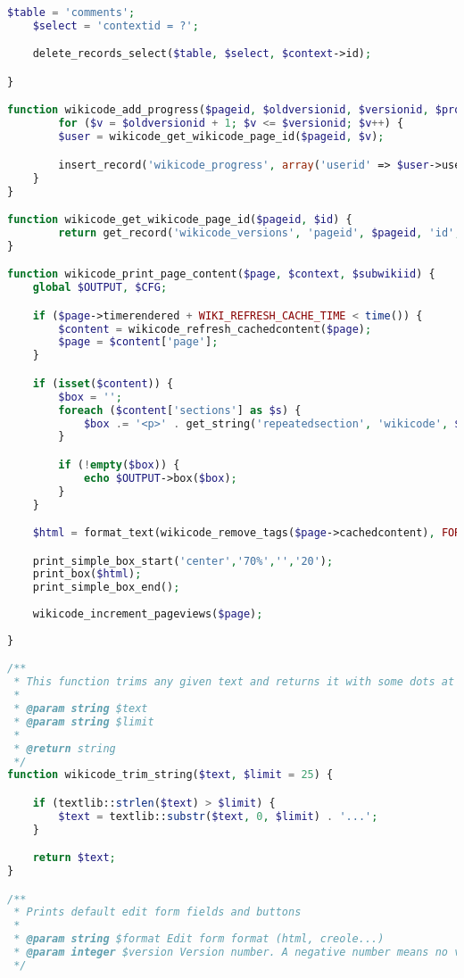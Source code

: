 \begin{lstlisting}[language=PHP]
    $table = 'comments';
    $select = 'contextid = ?';

    delete_records_select($table, $select, $context->id);

}

function wikicode_add_progress($pageid, $oldversionid, $versionid, $progress) {
        for ($v = $oldversionid + 1; $v <= $versionid; $v++) {
        $user = wikicode_get_wikicode_page_id($pageid, $v);

        insert_record('wikicode_progress', array('userid' => $user->userid, 'pageid' => $pageid, 'versionid' => $v, 'progress' => $progress));
    }
}

function wikicode_get_wikicode_page_id($pageid, $id) {
        return get_record('wikicode_versions', 'pageid', $pageid, 'id', $id);
}

function wikicode_print_page_content($page, $context, $subwikiid) {
    global $OUTPUT, $CFG;

    if ($page->timerendered + WIKI_REFRESH_CACHE_TIME < time()) {
        $content = wikicode_refresh_cachedcontent($page);
        $page = $content['page'];
    }

    if (isset($content)) {
        $box = '';
        foreach ($content['sections'] as $s) {
            $box .= '<p>' . get_string('repeatedsection', 'wikicode', $s) . '</p>';
        }

        if (!empty($box)) {
            echo $OUTPUT->box($box);
        }
    }

    $html = format_text(wikicode_remove_tags($page->cachedcontent), FORMAT_PLAIN, array('overflowdiv'=>true));

	print_simple_box_start('center','70%','','20');
    print_box($html);
	print_simple_box_end();
	
    wikicode_increment_pageviews($page);
	
}

/**
 * This function trims any given text and returns it with some dots at the end
 *
 * @param string $text
 * @param string $limit
 *
 * @return string
 */
function wikicode_trim_string($text, $limit = 25) {

    if (textlib::strlen($text) > $limit) {
        $text = textlib::substr($text, 0, $limit) . '...';
    }

    return $text;
}

/**
 * Prints default edit form fields and buttons
 *
 * @param string $format Edit form format (html, creole...)
 * @param integer $version Version number. A negative number means no versioning.
 */


\end{lstlisting}
